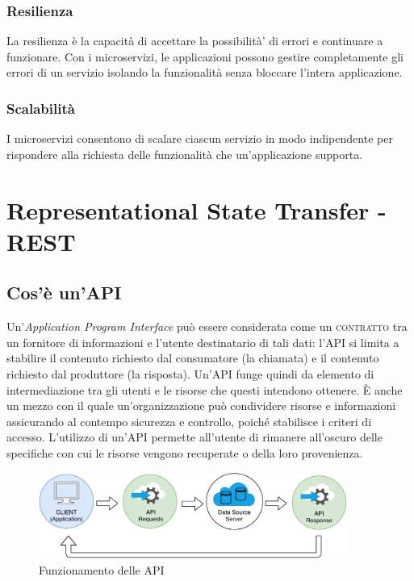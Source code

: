 \subsubsection{Resilienza}
La resilienza è la capacità di accettare la possibilità’ di errori e continuare a funzionare. Con i microservizi, le applicazioni possono gestire completamente gli errori di un servizio isolando la funzionalità senza bloccare l’intera applicazione.

\subsubsection{Scalabilità}
I microservizi consentono di scalare ciascun servizio in modo indipendente per rispondere alla richiesta delle funzionalità che un'applicazione supporta. 


\section{Representational State Transfer - REST}
\subsection{Cos'è un'API}
Un'\textit{Application Program Interface} può essere considerata come un \textsc{contratto} tra un fornitore di informazioni e l'utente destinatario di tali dati: l'API si limita a stabilire il contenuto richiesto dal consumatore (la chiamata) e il contenuto richiesto dal produttore (la risposta). Un'API funge quindi da elemento di intermediazione tra gli utenti e le risorse che questi intendono ottenere. È anche un mezzo con il quale un'organizzazione può condividere risorse e informazioni assicurando al contempo sicurezza e controllo, poiché stabilisce i criteri di accesso. L'utilizzo di un'API permette all'utente di rimanere all'oscuro delle specifiche con cui le risorse vengono recuperate o della loro provenienza.
\begin{figure}[H]
    \centering
    \includegraphics[width=0.90\textwidth]{images/01_9_api.pdf}
    \caption{Funzionamento delle API}
    \label{fig:api}
\end{figure}

